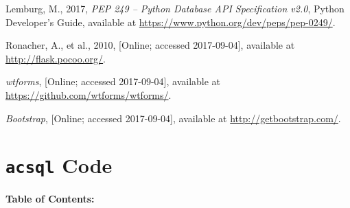 \documentclass[10pt,journal,compsoc]{IEEEtran}
\begin{document}
\begin{thebibliography}{1}
Lemburg, M., 2017, \emph{PEP 249 -- Python Database API Specification v2.0}, Python Developer's Guide,
available at \textcolor{blue}{\url{https://www.python.org/dev/peps/pep-0249/}}.

Ronacher, A., et al., 2010, [Online; accessed 2017-09-04], available at \textcolor{blue}{\url{http://flask.pocoo.org/}}.

\emph{wtforms}, [Online; accessed 2017-09-04], available at \textcolor{blue}{\url{https://github.com/wtforms/wtforms/}}.

\emph{Bootstrap}, [Online; accessed 2017-09-04], available at \textcolor{blue}{\url{http://getbootstrap.com/}}.

\end{thebibliography}

\onecolumn
\newpage
\appendices
\section{\texttt{acsql} Code}

\bigskip\textbf{Table of Contents:}\bigskip
\end{document}
